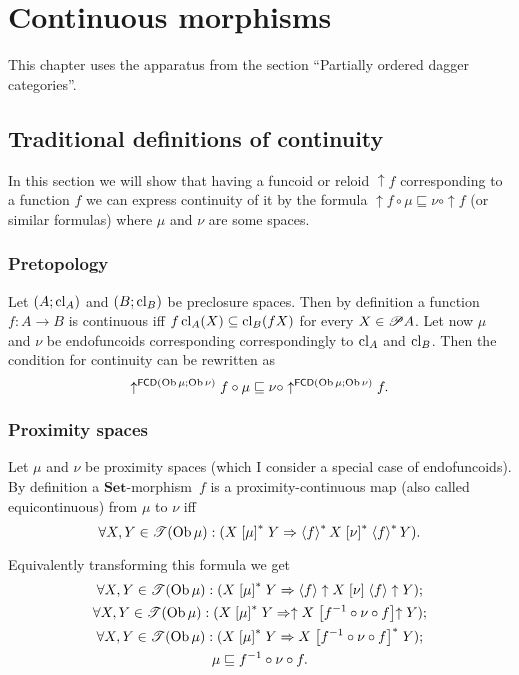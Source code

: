 
\chapter{Continuous morphisms}

This chapter uses the apparatus from the section ``Partially ordered
dagger categories''.


\section{Traditional definitions of continuity}

In this section we will show that having a funcoid or reloid $\uparrow f$
corresponding to a function $f$ we can express continuity of it by
the formula $\uparrow f\circ\mu\sqsubseteq\nu\circ\uparrow f$ (or
similar formulas) where $\mu$ and $\nu$ are some spaces.


\subsection{Pretopology}

Let $(A;\operatorname{cl}_{A})$ and $(B;\operatorname{cl}_{B})$ be preclosure spaces. Then by
definition a function $f:A\rightarrow B$ is continuous iff $f\operatorname{cl}_{A}(X)\subseteq\operatorname{cl}_{B}(fX)$
for every $X\in\mathscr{P} A$. Let now $\mu$ and $\nu$ be endofuncoids
corresponding correspondingly to $\operatorname{cl}_{A}$ and $\operatorname{cl}_{B}$. Then the
condition for continuity can be rewritten as
\[
\uparrow^{\mathsf{FCD}(\operatorname{Ob}\mu;\operatorname{Ob}\nu)}f\circ\mu\sqsubseteq\nu\circ\uparrow^{\mathsf{FCD}(\operatorname{Ob}\mu;\operatorname{Ob}\nu)}f.
\]



\subsection{Proximity spaces}

Let $\mu$ and $\nu$ be proximity spaces (which I consider a special
case of endofuncoids). By definition a $\mathbf{Set}$-morphism~$f$
is a proximity-continuous map (also called equicontinuous) from $\mu$
to $\nu$ iff
\[
\forall X,Y\in\mathscr{T}(\operatorname{Ob}\mu):(X\mathrel{\left[\mu\right]^{\ast}}Y\Rightarrow\left\langle f\right\rangle ^{\ast}X\mathrel{\left[\nu\right]^{\ast}}\left\langle f\right\rangle ^{\ast}Y).
\]


Equivalently transforming this formula we get
\begin{gather*}
\forall X,Y\in\mathscr{T}(\operatorname{Ob}\mu):(X\mathrel{\left[\mu\right]^{\ast}}Y\Rightarrow\left\langle f\right\rangle\uparrow X\mathrel{\left[\nu\right]}\left\langle f\right\rangle\uparrow Y);\\
\forall X,Y\in\mathscr{T}(\operatorname{Ob}\mu):(X\mathrel{\left[\mu\right]^{\ast}}Y\Rightarrow\uparrow X\mathrel{\left[f^{-1}\circ\nu\circ f\right]}\uparrow Y);\\
\forall X,Y\in\mathscr{T}(\operatorname{Ob}\mu):(X\mathrel{\left[\mu\right]^{\ast}}Y\Rightarrow X\mathrel{\left[f^{-1}\circ\nu\circ f\right]^{\ast}}Y);\\
\mu\sqsubseteq f^{-1}\circ\nu\circ f.
\end{gather*}


